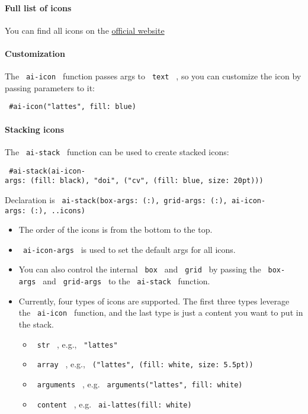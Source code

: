 \paragraph{Full list of icons}\label{full-list-of-icons}

You can find all icons on the
\href{https://jpswalsh.github.io/academicons/}{official website}

\paragraph{Customization}\label{customization}

The \texttt{\ ai-icon\ } function passes args to \texttt{\ text\ } , so
you can customize the icon by passing parameters to it:

\texttt{\ \#ai-icon("lattes",\ fill:\ blue)\ }

\paragraph{Stacking icons}\label{stacking-icons}

The \texttt{\ ai-stack\ } function can be used to create stacked icons:

\texttt{\ \#ai-stack(ai-icon-args:\ (fill:\ black),\ "doi",\ ("cv",\ (fill:\ blue,\ size:\ 20pt)))\ }

Declaration is
\texttt{\ ai-stack(box-args:\ (:),\ grid-args:\ (:),\ ai-icon-args:\ (:),\ ..icons)\ }

\begin{itemize}
\tightlist
\item
  The order of the icons is from the bottom to the top.
\item
  \texttt{\ ai-icon-args\ } is used to set the default args for all
  icons.
\item
  You can also control the internal \texttt{\ box\ } and
  \texttt{\ grid\ } by passing the \texttt{\ box-args\ } and
  \texttt{\ grid-args\ } to the \texttt{\ ai-stack\ } function.
\item
  Currently, four types of icons are supported. The first three types
  leverage the \texttt{\ ai-icon\ } function, and the last type is just
  a content you want to put in the stack.

  \begin{itemize}
  \tightlist
  \item
    \texttt{\ str\ } , e.g., \texttt{\ "lattes"\ }
  \item
    \texttt{\ array\ } , e.g.,
    \texttt{\ ("lattes",\ (fill:\ white,\ size:\ 5.5pt))\ }
  \item
    \texttt{\ arguments\ } , e.g.
    \texttt{\ arguments("lattes",\ fill:\ white)\ }
  \item
    \texttt{\ content\ } , e.g. \texttt{\ ai-lattes(fill:\ white)\ }
  \end{itemize}
\end{itemize}

